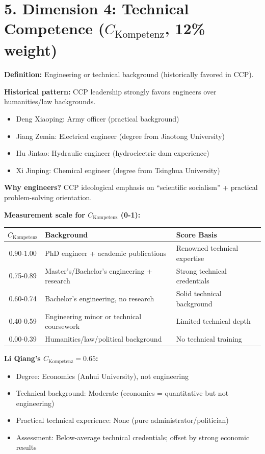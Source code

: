 \documentclass[11pt]{article}
\begin{document}
\section{5. Dimension 4: Technical Competence ($C_{\text{Kompetenz}}$, 12\% weight)}

\textbf{Definition:} Engineering or technical background (historically favored in CCP).

\textbf{Historical pattern:} CCP leadership strongly favors engineers over humanities/law backgrounds.
\begin{itemize}
\item Deng Xiaoping: Army officer (practical background)
\item Jiang Zemin: Electrical engineer (degree from Jiaotong University)
\item Hu Jintao: Hydraulic engineer (hydroelectric dam experience)
\item Xi Jinping: Chemical engineer (degree from Tsinghua University)
\end{itemize}

\textbf{Why engineers?} CCP ideological emphasis on ``scientific socialism'' + practical problem-solving orientation.

\textbf{Measurement scale for $C_{\text{Kompetenz}}$ (0-1):}

\begin{table}[h]
\centering
\begin{tabular}{|c|l|l|}
\hline
$C_{\text{Kompetenz}}$ & \textbf{Background} & \textbf{Score Basis} \\
\hline
0.90-1.00 & PhD engineer + academic publications & Renowned technical expertise \\
0.75-0.89 & Master's/Bachelor's engineering + research & Strong technical credentials \\
0.60-0.74 & Bachelor's engineering, no research & Solid technical background \\
0.40-0.59 & Engineering minor or technical coursework & Limited technical depth \\
0.00-0.39 & Humanities/law/political background & No technical training \\
\hline
\end{tabular}
\end{table}

\textbf{Li Qiang's $C_{\text{Kompetenz}} = 0.65$:}
\begin{itemize}
\item Degree: Economics (Anhui University), not engineering
\item Technical background: Moderate (economics = quantitative but not engineering)
\item Practical technical experience: None (pure administrator/politician)
\item Assessment: Below-average technical credentials; offset by strong economic results
\end{itemize}
\end{document}

